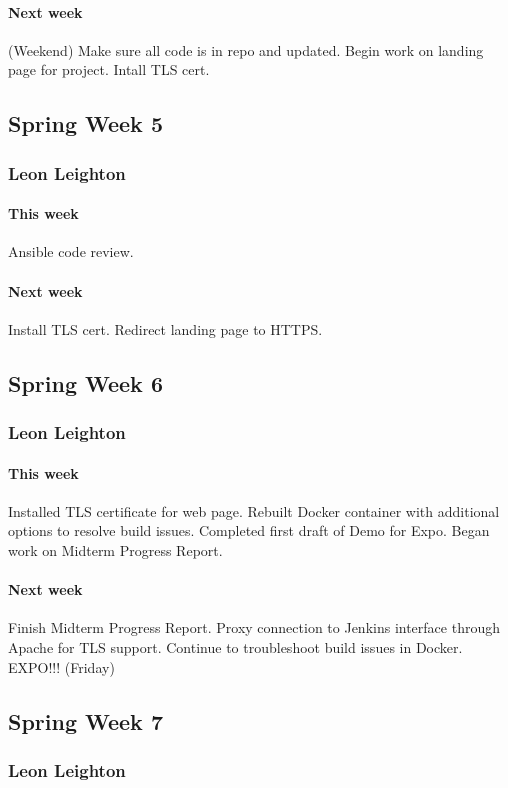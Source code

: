 \documentclass[10pt,letterpaper,onecolumn,draftclsnofoot]{IEEEtran}
\begin{document}
\paragraph{Next week}(Weekend) Make sure all code is in repo and updated.  
Begin work on landing page for project.  
Intall TLS cert.


\subsection{Spring Week 5}
\subsubsection{Leon Leighton}
\paragraph{This week} Ansible code review.
\paragraph{Next week} Install TLS cert. Redirect landing page to HTTPS.

\subsection{Spring Week 6}
\subsubsection{Leon Leighton}
\paragraph{This week}Installed TLS certificate for web page.  
Rebuilt Docker container with additional options to resolve build issues.  
Completed first draft of Demo for Expo.  
Began work on Midterm Progress Report.
\paragraph{Next week}Finish Midterm Progress Report.  
Proxy connection to Jenkins interface through Apache for TLS support.  
Continue to troubleshoot build issues in Docker.  
EXPO!!! (Friday)

\subsection{Spring Week 7}
\subsubsection{Leon Leighton}
\end{document}
